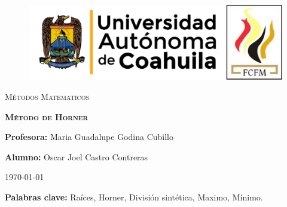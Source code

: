 \documentclass[12pt]{article}
\begin{document}
		
		\begin{titlepage}
		
			\centering
			{\bfseries
			\begin{figure}[h!]
				\centering
				\includegraphics[width=\linewidth]{Nom_UAdeC_FCFM.png} 				
			\end{figure}
			\par}
			\vspace{2cm}
			{\scshape\LARGE Métodos Matematicos \par}
			\vspace{3cm}
			{\scshape\Huge \textbf{Método de Horner} \par}
			\vfill
			{\LARGE \textbf{Profesora:} Maria Guadalupe Godina Cubillo \par}
			\vspace{3cm}
			{\LARGE \textbf{Alumno:} Oscar Joel Castro Contreras \par}
			\vfill
			{\Large \today \par}
			\thispagestyle{empty}
			
		\end{titlepage}
	
		\newpage

		\begin{abstract}
			\noindent En este reporte explico un poco de los métodos que existen para encontrar las raíces de cualquier 
			polinomio o función que tenga raíces, y en específico explico, qué es, en que consiste y cuales son las 
			limitaciones del método de Horner para encontrar raíces de polinomios.
		\end{abstract}

		\textbf{Palabras clave:} Raíces, Horner, División sintética, Maximo, Mínimo.
\end{document}
